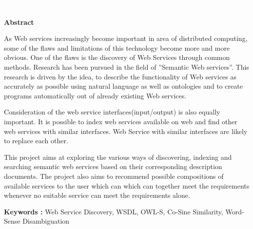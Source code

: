 \documentclass[12pt, oneside]{book}
\begin{document}
\pagebreak \textcolor{white}{text} \pagebreak
\thispagestyle{empty}
\begin{center}
	\textbf{ \huge Abstract}
\end{center}
\vspace{1cm}
As Web services increasingly become important in area of distributed computing, some of the flaws and limitations of this technology become more and more obvious. One of the flaws is the discovery of Web Services through common methods. Research has been pursued in the field of ”Semantic Web services”. This research is driven by the idea, to describe the functionality of Web services as accurately as possible using natural language as well as ontologies and to create programs automatically out of already existing Web services. \\ \par
Consideration of the web service interfaces(input/output) is also equally important. It is possible to index web services available on web and find other web services with similar interfaces. Web Service with similar interfaces are likely to replace each other. \\ \par
This project aims at exploring the various ways of discovering, indexing and searching semantic web services based on their corresponding description documents. The project also aims to recommend possible compositions of available services to the user which can which can together meet the requirements whenever no suitable service can meet the requirements alone.\\ \par
\textbf{Keywords : }Web Service Discovery, WSDL, OWL-S, Co-Sine Similarity, Word-Sense Disambiguation
\pagebreak
\thispagestyle{empty}
\pagebreak
\listoffigures
\listoftables
\tableofcontents

\pagebreak

\setcounter{page}{1}
\end{document}
